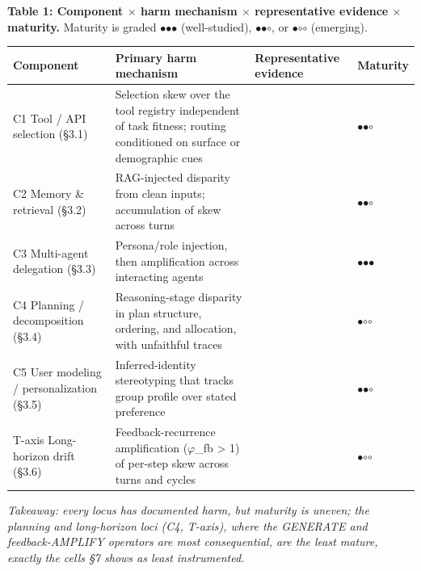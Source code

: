 \documentclass[10pt]{article}
\begin{document}
\textbf{Table 1: Component $\times$ harm mechanism $\times$ representative evidence $\times$ maturity.} Maturity is graded $\bullet$$\bullet$$\bullet$ (well-studied), $\bullet$$\bullet$$\circ$, or $\bullet$$\circ$$\circ$ (emerging).

\begin{center}\footnotesize
\begin{longtable}{|p{}|p{}|p{}|p{}|}
\hline \textbf{Component} & \textbf{Primary harm mechanism} & \textbf{Representative evidence} & \textbf{Maturity} \\ \hline\endhead
C1 Tool / API selection (\S{}3.1) & Selection skew over the tool registry independent of task fitness; routing conditioned on surface or demographic cues & \cite{blankenstein2025biasbusters,sneh2025tooltweak,xu2026ducx} & $\bullet$$\bullet$$\circ$ \\ \hline
C2 Memory \& retrieval (\S{}3.2) & RAG-injected disparity from clean inputs; accumulation of skew across turns & \cite{hu2024free,wu2024rag,fan2024fairmt} & $\bullet$$\bullet$$\circ$ \\ \hline
C3 Multi-agent delegation (\S{}3.3) & Persona/role injection, then amplification across interacting agents & \cite{nguyen2025social,madigan2025emergent,choi2025identity} & $\bullet$$\bullet$$\bullet$ \\ \hline
C4 Planning / decomposition (\S{}3.4) & Reasoning-stage disparity in plan structure, ordering, and allocation, with unfaithful traces & \cite{wu2025reasoning,parziale2026once,hall2025guiding} & $\bullet$$\circ$$\circ$ \\ \hline
C5 User modeling / personalization (\S{}3.5) & Inferred-identity stereotyping that tracks group profile over stated preference & \cite{kantharuban2024stereotype,pawar2025presumed,staab2023memorization} & $\bullet$$\bullet$$\circ$ \\ \hline
T-axis Long-horizon drift (\S{}3.6) & Feedback-recurrence amplification ($\varphi$\_fb > 1) of per-step skew across turns and cycles & \cite{ma2026implicit,liu2025truth,wyllie2024fairness} & $\bullet$$\circ$$\circ$ \\ \hline
\end{longtable}\end{center}

\emph{Takeaway: every locus has documented harm, but maturity is uneven; the planning and long-horizon loci (C4, T-axis), where the GENERATE and feedback-AMPLIFY operators are most consequential, are the least mature, exactly the cells \S{}7 shows as least instrumented.}
\end{document}
